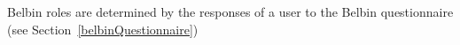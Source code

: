 Belbin roles are determined by the responses of a user to the Belbin questionnaire (see Section~\ref{belbinQuestionnaire})